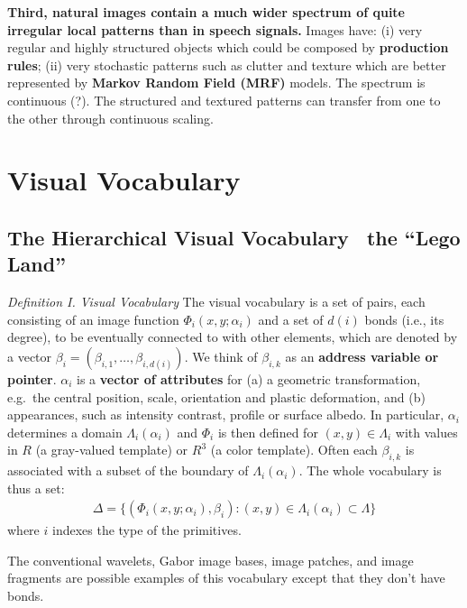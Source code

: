 \documentclass[../Notes_of_CaRiVaC.tex]{subfiles}
\begin{document}
\textbf{Third, natural images contain a much wider spectrum of quite irregular
local patterns than in speech signals.} Images have: (i) very regular and
highly structured objects which could be composed by \textbf{production rules};
(ii) very stochastic patterns such as clutter and texture which are better
represented by \textbf{Markov Random Field (MRF)} models. The spectrum is
continuous {\color{red} (?)}. The structured and textured patterns can transfer
from one to the other through continuous scaling\cite{wang2008}\cite{wu2008}.

\section{Visual Vocabulary}%
\label{sec:ii.2.2}
\subsection{The Hierarchical Visual Vocabulary \textendash~the ``Lego Land''}%
\label{sec:ii.2.2.1}
\begin{textbox}{\textit{Definition I. Visual Vocabulary}}
The visual vocabulary is a set of pairs, each consisting of an image function
$\Phi_i(x, y; \alpha_i)$ and a set of $d(i)$ bonds (i.e., its degree), to be
eventually connected to with other elements, which are denoted by a vector
$\beta_i = (\beta_{i,1}, \ldots, \beta_{i, d(i)})$. We think of $\beta_{i,k}$
as an \textbf{address variable or pointer}. $\alpha_i$ is a \textbf{vector of
attributes} for (a) a geometric transformation, e.g.\ the central position,
scale, orientation and plastic deformation, and (b) appearances, such as
intensity contrast, profile or surface albedo. In particular, $\alpha_i$
determines a domain $\Lambda_i(\alpha_i)$ and $\Phi_i$ is then defined for
$(x, y) \in \Lambda_i$ with values in $R$ (a gray-valued template) or $R^3$ (a
color template). Often each $\beta_{i,k}$ is associated with a subset of the
boundary of $\Lambda_i(\alpha_i)$. The whole vocabulary is thus a set:
%
\begin{align}
  \label{eq:ii.2.2}
  \Delta = \{(\Phi_i(x, y; \alpha_i), \beta_i): (x, y) \in  \Lambda_i(\alpha_i) \subset \Lambda\}
\end{align}
%
where $i$ indexes the type of the primitives.
\end{textbox}

The conventional wavelets, Gabor image bases, image patches, and image
fragments are possible examples of this vocabulary except that they don't have
bonds.
\end{document}
